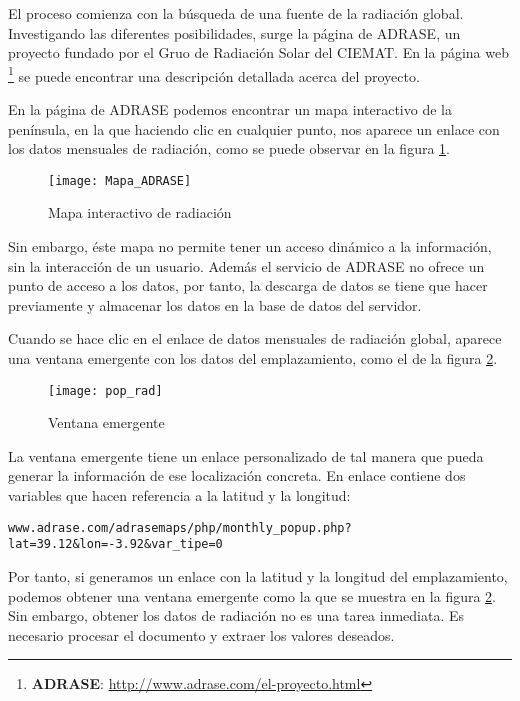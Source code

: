 El proceso comienza con la búsqueda de una fuente de la radiación global. Investigando las diferentes posibilidades, surge la página de ADRASE, un proyecto fundado por el Gruo de Radiación Solar del CIEMAT. En la página web \footnote{ \textbf{ADRASE}: \url{http://www.adrase.com/el-proyecto.html}} se puede encontrar una descripción detallada acerca del proyecto.

En la página de ADRASE podemos encontrar un mapa interactivo de la península, en la que haciendo clic en cualquier punto, nos aparece un enlace con los datos mensuales de radiación, como se puede observar en la figura \ref{fig:mapa_adrase}.

\begin{figure}[htbp]
\texttt{[image: Mapa\_ADRASE]}
\centering
\caption{Mapa interactivo de radiación
\label{fig:mapa_adrase}}
\end{figure}

Sin embargo, éste mapa no permite tener un acceso dinámico a la información, sin la interacción de un usuario. Además el servicio de ADRASE no ofrece un punto de acceso a los datos, por tanto, la descarga de datos se tiene que hacer previamente y almacenar los datos en la base de datos del servidor.

Cuando se hace clic en el enlace de datos mensuales de radiación global, aparece una ventana emergente con los datos del emplazamiento, como el de la figura \ref{fig:pop_rad}.

\begin{figure}[htbp]
\texttt{[image: pop\_rad]}
\centering
\caption{Ventana emergente
\label{fig:pop_rad}}
\end{figure}

La ventana emergente tiene un enlace personalizado de tal manera que pueda generar la información de ese localización concreta. En enlace contiene dos variables que hacen referencia a la latitud y la longitud:

\begin{lstlisting}[style=ES6, caption={Enlace tipo de la radiación en la peninsula}]
www.adrase.com/adrasemaps/php/monthly_popup.php?lat=39.12&lon=-3.92&var_tipe=0
\end{lstlisting}

Por tanto, si generamos un enlace con la latitud y la longitud del emplazamiento, podemos obtener una ventana emergente como la que se muestra en la figura \ref{fig:pop_rad}. Sin embargo, obtener los datos de radiación no es una tarea inmediata. Es necesario procesar el documento y extraer los valores deseados.


